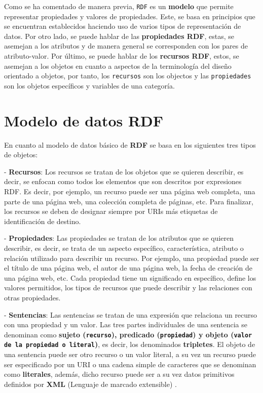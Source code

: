 \documentclass[11pt]{report}
\begin{document}
Como se ha comentado de manera previa, \texttt{RDF} es un \textbf{modelo} que permite representar propiedades y valores de propiedades. Este, se basa en principios que se encuentran establecidos haciendo uso de varios tipos de representación de datos. Por otro lado, se puede hablar de las \textbf{propiedades RDF}, estas, se asemejan a los atributos y de manera general se corresponden con los pares de atributo-valor. Por último, se puede hablar de los \textbf{recursos RDF}, estos, se asemejan a los objetos en cuanto a aspectos de la terminología del diseño orientado a objetos, por tanto, los \texttt{recursos} son los objectos y las \texttt{propiedades} son los objetos específicos y variables de una categoría.

\section{Modelo de datos RDF}

En cuanto al modelo de datos básico de \textbf{RDF} se basa en los siguientes tres tipos de objetos:

- \textbf{Recursos}: Los recursos se tratan de los objetos que se quieren describir, es decir, se enfocan como todos los elementos que son descritos por expresiones RDF. Es decir, por ejemplo, un recurso puede ser una página web completa, una parte de una página web, una colección completa de páginas, etc. Para finalizar, los recursos se deben de designar siempre por URIs más etiquetas de identificación de destino.

- \textbf{Propiedades}: Las propiedades se tratan de los atributos que se quieren describir, es decir, se trata de un aspecto específico, característica, atributo o relación utilizado para describir un recurso. Por ejemplo, una propiedad puede ser el título de una página web, el autor de una página web, la fecha de creación de una página web, etc.  Cada propiedad tiene un significado en específico, define los valores permitidos, los tipos de recursos que puede describir y las relaciones con otras propiedades.

- \textbf{Sentencias}: Las sentencias se tratan de una expresión que relaciona un recurso con una propiedad y un valor. Las tres partes individuales de una sentencia se denominan como \textbf{sujeto (\texttt{recurso}), predicado (\texttt{propiedad}) y objeto (\texttt{valor de la propiedad o literal})}, es decir, los denominados \textbf{tripletes}. El objeto de una sentencia puede ser otro recurso o un valor literal, a su vez un recurso puede ser especificado por un URI o una cadena simple de caracteres que se denominan como \textbf{literales}, además, dicho recurso puede ser a su vez datos primitivos definidos por \textbf{XML} (Lenguaje de marcado extensible) \cite{6}.
\end{document}
